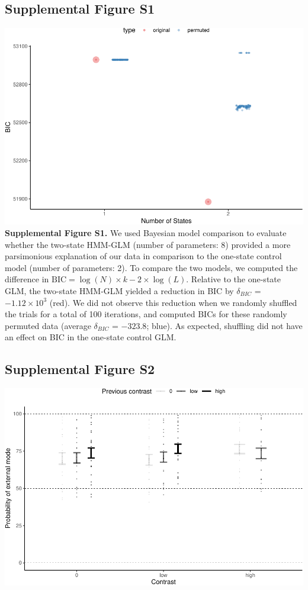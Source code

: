 \documentclass[
]{article}
\begin{document}
\hypertarget{supplemental-figure-s1}{%
\subsection{Supplemental Figure S1}\label{supplemental-figure-s1}}

\includegraphics{predictive_templates_files/figure-latex/rev_Supplemental_Figure_S1-1.pdf}
\textbf{Supplemental Figure S1.} We used Bayesian model comparison to
evaluate whether the two-state HMM-GLM (number of parameters: 8)
provided a more parsimonious explanation of our data in comparison to
the one-state control model (number of parameters: 2). To compare the
two models, we computed the difference in
\(\text{BIC} = \log(N) \times k - 2 \times \log(L)\). Relative to the
one-state GLM, the two-state HMM-GLM yielded a reduction in BIC by
\(\delta_{BIC}\) = \(\ensuremath{-1.12\times 10^{3}}\) (red). We did not
observe this reduction when we randomly shuffled the trials for a total
of 100 iterations, and computed BICs for these randomly permuted data
(average \(\delta_{BIC}\) = \(-323.8\); blue). As expected, shuffling
did not have an effect on BIC in the one-state control GLM.

\newpage

\hypertarget{supplemental-figure-s2}{%
\subsection{Supplemental Figure S2}\label{supplemental-figure-s2}}

\includegraphics{predictive_templates_files/figure-latex/Supplemental_Figure_S2-1.pdf}
\end{document}
